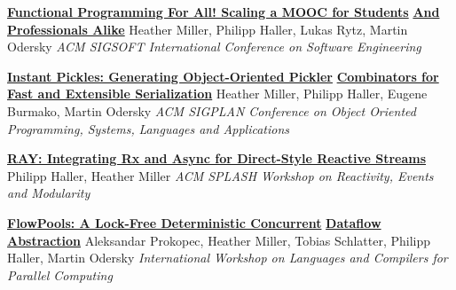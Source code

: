 \documentclass[9pt]{article}
\begin{document}
\noindent\href{http://infoscience.epfl.ch/record/190022}{\bf Functional Programming For All! Scaling a MOOC for Students}\vspace{-0.03in}
\newline\noindent\href{http://infoscience.epfl.ch/record/190022}{\bf And Professionals Alike}
\newline\noindent Heather Miller, Philipp Haller, Lukas Rytz, Martin Odersky
\newline\noindent\emph{ACM SIGSOFT International Conference on Software Engineering}
\bigskip

\noindent\href{http://infoscience.epfl.ch/record/188383}{\bf Instant Pickles: Generating Object-Oriented Pickler}\vspace{-0.03in}
\newline\noindent\href{http://infoscience.epfl.ch/record/188383}{\bf Combinators for Fast and Extensible Serialization}
\newline\noindent Heather Miller, Philipp Haller, Eugene Burmako, Martin Odersky
\newline\noindent\emph{ACM SIGPLAN Conference on Object Oriented Programming, Systems,}
\newline\noindent\emph{Languages and Applications}
\bigskip

\noindent\href{http://infoscience.epfl.ch/record/188383}{\bf RAY: Integrating Rx and Async for Direct-Style Reactive Streams}
\newline\noindent Philipp Haller, Heather Miller
\newline\noindent\emph{ACM SPLASH Workshop on Reactivity, Events and Modularity}
\bigskip

\noindent\href{http://infoscience.epfl.ch/record/180265}{\bf FlowPools: A Lock-Free Deterministic Concurrent}\vspace{-0.03in}
\newline\noindent\href{http://infoscience.epfl.ch/record/180265}{\bf Dataflow Abstraction}
\newline\noindent Aleksandar Prokopec, Heather Miller, Tobias Schlatter,
\newline\noindent Philipp Haller, Martin Odersky
\newline\noindent\emph{International Workshop on Languages and Compilers for Parallel Computing}
\vspace{0.03in}
\newline{}
\vspace{-0.03in}
\newline{}
\vspace{-0.03in}
\newline{}
\bigskip
\end{document}
